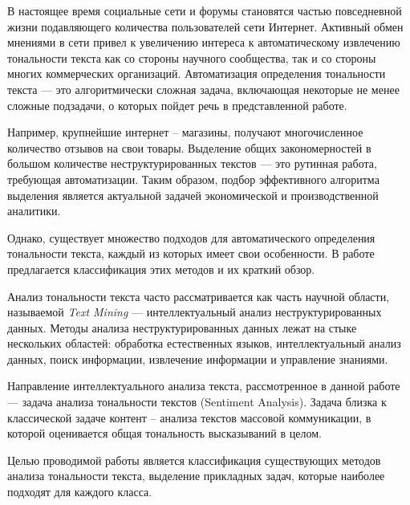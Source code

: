 \setcounter{page}{2}
В настоящее время социальные сети и форумы становятся частью повседневной жизни подавляющего количества пользователей сети Интернет. Активный обмен мнениями в сети привел к увеличению интереса к автоматическому извлечению тональности текста как со стороны научного сообщества, так и со стороны многих коммерческих организаций. Автоматизация определения тональности текста --- это алгоритмически сложная задача, включающая некоторые не менее сложные подзадачи, о которых пойдет речь в представленной работе.

Например, крупнейшие интернет -- магазины, получают многочисленное количество отзывов на свои товары. Выделение общих закономерностей в большом количестве неструктурированных текстов --- это рутинная работа, требующая автоматизации. Таким образом, подбор эффективного алгоритма выделения является актуальной задачей экономической и производственной аналитики. 

Однако, существует множество подходов для автоматического определения тональности текста, каждый из которых имеет свои особенности. В работе предлагается классификация этих методов и их краткий обзор.

Анализ тональности текста часто рассматривается как часть научной области, называемой \textit{Text Mining} --- интеллектуальный анализ неструктурированных данных. Методы анализа неструктурированных данных лежат на стыке нескольких областей: обработка естественных языков, интеллектуальный анализ данных, поиск информации, извлечение информации и управление знаниями.\cite{data_mining}

Направление интеллектуального анализа текста, рассмотренное в данной работе --- задача анализа тональности текстов (Sentiment Analysis). Задача близка к классической задаче контент -- анализа текстов массовой коммуникации, в которой оценивается общая тональность высказываний в целом. 

Целью проводимой работы является классификация существующих методов анализа тональности текста, выделение прикладных задач, которые наиболее подходят для каждого класса.